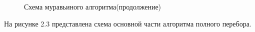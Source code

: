 \documentclass[a4paper,12pt]{report}
\begin{document}
\newpage
\begin{figure}[ht!]
\caption{Схема муравьиного алгоритма(продолжение)}
\end{figure}

\newpage

На рисунке 2.3 представлена схема основной части алгоритма полного перебора.
\end{document}
